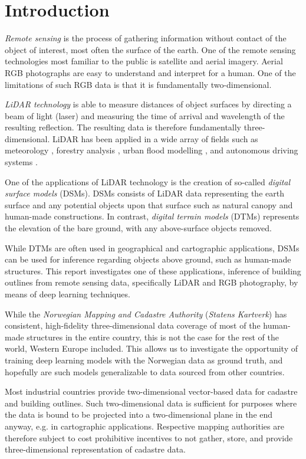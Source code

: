 \section*{Introduction}

\textit{Remote sensing} is the process of gathering information without contact of the object of interest, most often the surface of the earth.
One of the remote sensing technologies most familiar to the public is satellite and aerial imagery.
Aerial RGB photographs are easy to understand and interpret for a human.
One of the limitations of such RGB data is that it is fundamentally two-dimensional.

\textit{LiDAR technology} is able to measure distances of object surfaces by directing a beam of light (laser) and measuring the time of arrival and wavelength of the resulting reflection.
The resulting data is therefore fundamentally three-dimensional.
LiDAR has been applied in a wide array of fields such as meteorology \cite{lidar_meteorology_1966}, forestry analysis \cite{lidar_forestry_2000}, urban flood modelling \cite{lidar_flood_2013}, and autonomous driving systems \cite{lidar_self_driving_2018}.

One of the applications of LiDAR technology is the creation of so-called \textit{digital surface models} (DSMs).
DSMs consists of LiDAR data representing the earth surface and any potential objects upon that surface such as natural canopy and human-made constructions.
In contrast, \textit{digital terrain models} (DTMs) represents the elevation of the bare ground, with any above-surface objects removed.

While DTMs are often used in geographical and cartographic applications, DSMs can be used for inference regarding objects above ground, such as human-made structures.
This report investigates one of these applications, inference of building outlines from remote sensing data, specifically LiDAR and RGB photography, by means of deep learning techniques.

While the \textit{Norwegian Mapping and Cadastre Authority} (\textit{Statens Kartverk}) has consistent, high-fidelity three-dimensional data coverage of most of the human-made structures in the entire country, this is not the case for the rest of the world, Western Europe included.
This allows us to investigate the opportunity of training deep learning models with the Norwegian data as ground truth, and hopefully are such models generalizable to data sourced from other countries.

Most industrial countries provide two-dimensional vector-based data for cadastre and building outlines.
Such two-dimensional data is sufficient for purposes where the data is bound to be projected into a two-dimensional plane in the end anyway, e.g. in cartographic applications.
Respective mapping authorities are therefore subject to cost prohibitive incentives to not gather, store, and provide three-dimensional representation of cadastre data.

